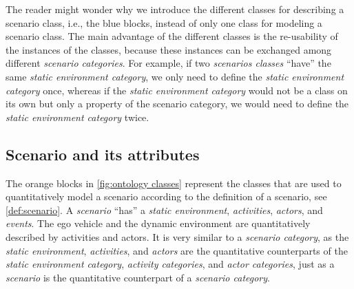 \cbstartc
The reader might wonder why we introduce the different classes for describing a scenario class, i.e., the blue blocks, instead of only one class for modeling a scenario class. 
The main advantage of the different classes is the re-usability of the instances of the classes, because these instances can be exchanged among different \textit{scenario categories}. For example, if two \textit{scenarios classes} ``have'' the same \textit{static environment category}, we only need to define the \textit{static environment category} once, whereas if the \textit{static environment category} would not be a class on its own but only a property of the scenario category, we would need to define the \textit{static environment category} twice.
\cbend


\subsection{Scenario and its attributes}
\label{sec:domain scenario}

The orange blocks in \cref{fig:ontology classes} represent the classes that are used to quantitatively model a scenario according to the definition of a scenario, see \cref{def:scenario}. A \textit{scenario} ``has'' a \textit{static environment}, \textit{activities}, \textit{actors}, and \textit{events}. 
\cbstartb
The ego vehicle and the dynamic environment are quantitatively described by activities and actors. 
\cbend
It is very similar to a \textit{scenario category}, as the \textit{static environment}, \textit{activities}, and \textit{actors} are the quantitative counterparts of the \textit{static environment category}, \textit{activity categories}, and \textit{actor categories}, just as a \textit{scenario} is the quantitative counterpart of a \textit{scenario category}. 

